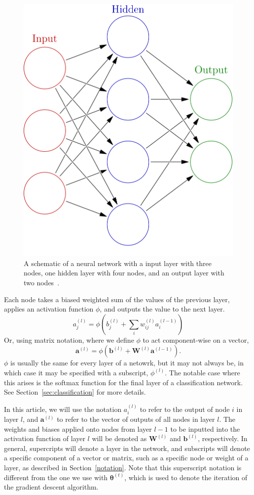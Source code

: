 \documentclass[12pt]{report}
\theoremstyle{definition}
\theoremstyle{remark}
\begin{document}
\begin{figure}[h]
    \centering
    \includegraphics[width=0.3\linewidth]{figs/colored_neural_network.png}
    \caption{A schematic of a neural network with a input layer with three nodes, one hidden layer with four nodes, and an output layer with two nodes~\cite{commons_filecolored_2025}.}
    \label{fig:enter-label}
\end{figure}

Each node takes a biased weighted sum of the values of the previous layer, applies an activation function $\phi$, and outputs the value to the next layer.
\begin{equation} \label{eq:node}
    a^{(l)}_j = \phi\left(b_j^{(l)} + \sum_i w_{ij}^{(l)} a_i^{(l-1)}\right)
\end{equation}
Or, using matrix notation, where we define $\phi$ to act component-wise on a vector,
\begin{equation}
    \mathbf{a}^{(l)} = \phi\left(\mathbf{b}^{(l)} + \mathbf{W}^{(l)}\mathbf{a}^{(l-1)}\right).
\end{equation}
$\phi$ is usually the same for every layer of a netowrk, but it may not always be, in which case it may be specified with a subscript, $\phi^{(l)}$. The notable case where this arises is the softmax function for the final layer of a classification network. See Section~\ref{sec:classification} for more details.

In this article, we will use the notation $a^{(l)}_i$ to refer to the output of node $i$ in layer $l$, and $\mathbf{a}^{(l)}$ to refer to the vector of outputs of all nodes in layer $l$. The weights and biases applied onto nodes from layer $l-1$ to be inputted into the activation function of layer $l$ will be denoted as $\mathbf{W}^{(l)}$ and $\mathbf{b}^{(l)}$, respectively. In general, supercripts will denote a layer in the network, and subscripts will denote a specific component of a vector or matrix, such as a specific node or weight of a layer, as described in Section~\ref{notation}. Note that this superscript notation is different from the one we use with $\boldsymbol{\theta}^{(t)}$, which is used to denote the iteration of the gradient descent algorithm.
\end{document}
